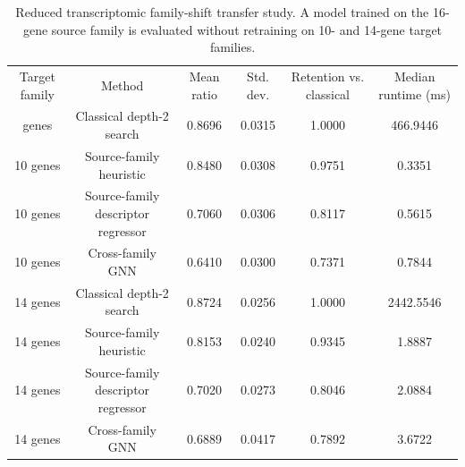 \documentclass[
  reprint,
  twocolumn,
  aps,
  superscriptaddress,
  longbibliography,
  floatfix
]{revtex4-2}
\begin{document}
\begin{table}[t]
\caption{Reduced transcriptomic family-shift transfer study. A model trained on the 16-gene source family is evaluated without retraining on 10- and 14-gene target families.}
\label{tab:cross-family-transfer-summary}
\begin{ruledtabular}
\begin{tabular}{cccccc}
Target family & Method & Mean ratio & Std. dev. & Retention vs. classical & Median runtime (ms) \\
\colrule
10 genes & Classical depth-2 search & 0.8696 & 0.0315 & 1.0000 & 466.9446 \\
10 genes & Source-family heuristic & 0.8480 & 0.0308 & 0.9751 & 0.3351 \\
10 genes & Source-family descriptor regressor & 0.7060 & 0.0306 & 0.8117 & 0.5615 \\
10 genes & Cross-family GNN & 0.6410 & 0.0300 & 0.7371 & 0.7844 \\
14 genes & Classical depth-2 search & 0.8724 & 0.0256 & 1.0000 & 2442.5546 \\
14 genes & Source-family heuristic & 0.8153 & 0.0240 & 0.9345 & 1.8887 \\
14 genes & Source-family descriptor regressor & 0.7020 & 0.0273 & 0.8046 & 2.0884 \\
14 genes & Cross-family GNN & 0.6889 & 0.0417 & 0.7892 & 3.6722 \\
\end{tabular}
\end{ruledtabular}
\end{table}
\end{document}
